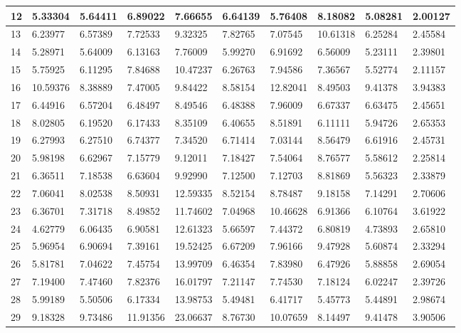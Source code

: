 \begin{table}[H]
{\begin{tabular}{|l|l|l|l|l|l|l|l|l|l|}
        12 & 5.33304 & 5.64411 & 6.89022 & 7.66655 & 6.64139 & 5.76408 & 8.18082 & 5.08281 & 2.00127 \\ \hline
        13 & 6.23977 & 6.57389 & 7.72533 & 9.32325 & 7.82765 & 7.07545 & 10.61318 & 6.25284 & 2.45584 \\ \hline
        14 & 5.28971 & 5.64009 & 6.13163 & 7.76009 & 5.99270 & 6.91692 & 6.56009 & 5.23111 & 2.39801 \\ \hline
        15 & 5.75925 & 6.11295 & 7.84688 & 10.47237 & 6.26763 & 7.94586 & 7.36567 & 5.52774 & 2.11157 \\ \hline
        16 & 10.59376 & 8.38889 & 7.47005 & 9.84422 & 8.58154 & 12.82041 & 8.49503 & 9.41378 & 3.94383 \\ \hline
        17 & 6.44916 & 6.57204 & 6.48497 & 8.49546 & 6.48388 & 7.96009 & 6.67337 & 6.63475 & 2.45651 \\ \hline
        18 & 8.02805 & 6.19520 & 6.17433 & 8.35109 & 6.40655 & 8.51891 & 6.11111 & 5.94726 & 2.65353 \\ \hline
        19 & 6.27993 & 6.27510 & 6.74377 & 7.34520 & 6.71414 & 7.03144 & 8.56479 & 6.61916 & 2.45731 \\ \hline
        20 & 5.98198 & 6.62967 & 7.15779 & 9.12011 & 7.18427 & 7.54064 & 8.76577 & 5.58612 & 2.25814 \\ \hline
        21 & 6.36511 & 7.18538 & 6.63604 & 9.92990 & 7.12500 & 7.12703 & 8.81869 & 5.56323 & 2.33879 \\ \hline
        22 & 7.06041 & 8.02538 & 8.50931 & 12.59335 & 8.52154 & 8.78487 & 9.18158 & 7.14291 & 2.70606 \\ \hline
        23 & 6.36701 & 7.31718 & 8.49852 & 11.74602 & 7.04968 & 10.46628 & 6.91366 & 6.10764 & 3.61922 \\ \hline
        24 & 4.62779 & 6.06435 & 6.90581 & 12.61323 & 5.66597 & 7.44372 & 6.80819 & 4.73893 & 2.65810 \\ \hline
        25 & 5.96954 & 6.90694 & 7.39161 & 19.52425 & 6.67209 & 7.96166 & 9.47928 & 5.60874 & 2.33294 \\ \hline
        26 & 5.81781 & 7.04622 & 7.45754 & 13.99709 & 6.46354 & 7.83980 & 6.47926 & 5.88858 & 2.69054 \\ \hline
        27 & 7.19400 & 7.47460 & 7.82376 & 16.01797 & 7.21147 & 7.74530 & 7.18124 & 6.02247 & 2.39726 \\ \hline
        28 & 5.99189 & 5.50506 & 6.17334 & 13.98753 & 5.49481 & 6.41717 & 5.45773 & 5.44891 & 2.98674 \\ \hline
        29 & 9.18328 & 9.73486 & 11.91356 & 23.06637 & 8.76730 & 10.07659 & 8.14497 & 9.41478 & 3.90506 \\ \hline

\end{tabular}}
\end{table}
